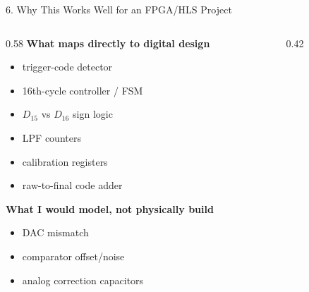 \documentclass[aspectratio=169]{beamer}
\begin{document}
\begin{frame}{6. Why This Works Well for an FPGA/HLS Project}
  \begin{columns}[T]
    \begin{column}{0.58\textwidth}
      \small
      \textbf{What maps directly to digital design}
      \begin{itemize}
        \item trigger-code detector
        \item 16th-cycle controller / FSM
        \item \(D_{15}\) vs \(D_{16}\) sign logic
        \item LPF counters
        \item calibration registers
        \item raw-to-final code adder
      \end{itemize}

      \textbf{What I would model, not physically build}
      \begin{itemize}
        \item DAC mismatch
        \item comparator offset/noise
        \item analog correction capacitors
      \end{itemize}
    \end{column}
    \begin{column}{0.42\textwidth}
      \centering
    \end{column}
  \end{columns}
\end{frame}
\end{document}
